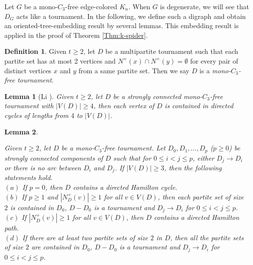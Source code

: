 \documentclass[11pt,a4paper]{article}
\newtheorem{lemma}{Lemma}
\theoremstyle{definition}
\newtheorem{definition}{Definition}
\begin{document}
Let $G$ be a mono-$C_3$-free edge-colored $K_n$. When $G$ is degenerate, we will see that $D_G$ acts like a tournament. In the following, we define such a digraph and obtain an oriented-tree-embedding result by several lemmas. This embedding result is applied in the proof of Theorem \ref{Thm:k-spider}.

\begin{definition}\label{def:monoC3-free-tournament}
    Given $t\geq 2$, let  $D$ be a multipartite tournament such that each partite set has at most 2 vertices and $N^+\left( x \right) \cap N^+\left( y \right) =\emptyset$ for every pair of distinct vertices $x$ and $y$ from a same partite set. Then we say $D$ is a {\it mono-$C_3$-free tournament}.
\end{definition}

\begin{lemma}[Li \cite{li_properly_2021}]\label{Lem:D-cycle}
Given $t\geq2$, let  $D$ be a strongly connected mono-$C_3$-free tournament with $|V(D)|\ge 4$,  then each vertex of $D$ is contained in directed cycles of lengths from $4$ to $|V(D)|$.
\end{lemma}
\begin{lemma}\label{Lem:D-cycle+}

Given $t\geq2$, let  $D$ be a mono-$C_3$-free tournament. Let $D_0,D_1,\ldots,D_p$ ($p\geq 0$) be  strongly  connected components of $D$ such that for $0\leq i<j\leq p$, either $D_j\rightarrow D_i$ or there is no arc between $D_i$ and $D_j$. If $|V(D)|\ge 3$, then the following statements hold.\\
 $(a)$  If $p=0$, then $D$ contains a directed Hamilton cycle.\\
 $(b)$  If $p\geq 1$  and $|N^+_D(v)|\geq 1$ for all $v\in V(D)$, then each partite set of size $2$ is contained in $D_0$, $D-D_0$ is a tournament and $D_j\rightarrow D_i$ for $0\leq i<j\leq p$.\\
 $(c)$ If $|N^+_D(v)|\geq 1$ for all $v\in V(D)$, then $D$ contains a directed Hamilton path.\\
 $(d)$ If there are at least two partite sets of size $2$ in $D$, then all the partite sets of size $2$ are contained in $D_0$, $D-D_0$ is a tournament and $D_j\rightarrow D_i$ for $0\leq i<j\leq p$.
\end{lemma}
\end{document}
